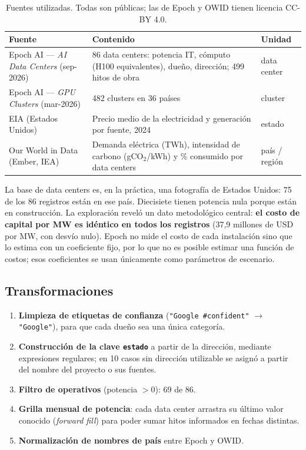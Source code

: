 \documentclass[11pt,a4paper]{article}
\begin{document}
\begin{table}[h]
\centering\small
\begin{tabularx}{\textwidth}{@{}l X l@{}}
\toprule
\textbf{Fuente} & \textbf{Contenido} & \textbf{Unidad} \\
\midrule
Epoch AI — \emph{AI Data Centers} (sep-2026) & 86 data centers: potencia IT, cómputo (H100 equivalentes), dueño, dirección; 499 hitos de obra & data center \\
Epoch AI — \emph{GPU Clusters} (mar-2026) & 482 clusters en 36 países & cluster \\
EIA (Estados Unidos) & Precio medio de la electricidad y generación por fuente, 2024 & estado \\
Our World in Data (Ember, IEA) & Demanda eléctrica (TWh), intensidad de carbono (gCO$_2$/kWh) y \% consumido por data centers & país / región \\
\bottomrule
\end{tabularx}
\caption{Fuentes utilizadas. Todas son públicas; las de Epoch y OWID tienen licencia CC-BY 4.0.}
\label{tab:fuentes}
\end{table}

La base de data centers es, en la práctica, una fotografía de Estados Unidos: 75 de los 86 registros están en ese país. Diecisiete tienen potencia nula porque están en construcción. La exploración reveló un dato metodológico central: \textbf{el costo de capital por MW es idéntico en todos los registros} (37,9 millones de USD por MW, con desvío nulo). Epoch no mide el costo de cada instalación sino que lo estima con un coeficiente fijo, por lo que no es posible estimar una función de costos; esos coeficientes se usan únicamente como parámetros de escenario.

\subsection{Transformaciones}

\begin{enumerate}
\item \textbf{Limpieza de etiquetas de confianza} (\texttt{"Google \#confident"} $\to$ \texttt{"Google"}), para que cada dueño sea una única categoría.
\item \textbf{Construcción de la clave \texttt{estado}} a partir de la dirección, mediante expresiones regulares; en 10 casos sin dirección utilizable se asignó a partir del nombre del proyecto o sus fuentes.
\item \textbf{Filtro de operativos} (potencia $>0$): 69 de 86.
\item \textbf{Grilla mensual de potencia}: cada data center arrastra su último valor conocido (\emph{forward fill}) para poder sumar hitos informados en fechas distintas.
\item \textbf{Normalización de nombres de país} entre Epoch y OWID.
\end{enumerate}
\end{document}
